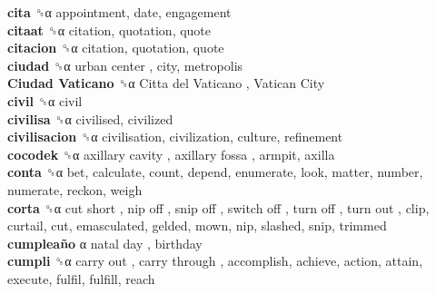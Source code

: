 \textbf{cita} ␝α  appointment, date, engagement  \\
\textbf{citaat} ␝α  citation, quotation, quote  \\
\textbf{citacion} ␝α  citation, quotation, quote  \\
\textbf{ciudad} ␝α   urban center , city, metropolis  \\
\textbf{Ciudad Vaticano} ␝α   Citta del Vaticano ,  Vatican City   \\
\textbf{civil} ␝α  civil  \\
\textbf{civilisa} ␝α  civilised, civilized  \\
\textbf{civilisacion} ␝α  civilisation, civilization, culture, refinement  \\
\textbf{cocodek} ␝α   axillary cavity ,  axillary fossa , armpit, axilla  \\
\textbf{conta} ␝α  bet, calculate, count, depend, enumerate, look, matter, number, numerate, reckon, weigh  \\
\textbf{corta} ␝α   cut short ,  nip off ,  snip off ,  switch off ,  turn off ,  turn out , clip, curtail, cut, emasculated, gelded, mown, nip, slashed, snip, trimmed  \\
\textbf{cumpleaño} α   natal day , birthday  \\
\textbf{cumpli} ␝α   carry out ,  carry through , accomplish, achieve, action, attain, execute, fulfil, fulfill, reach  \\
